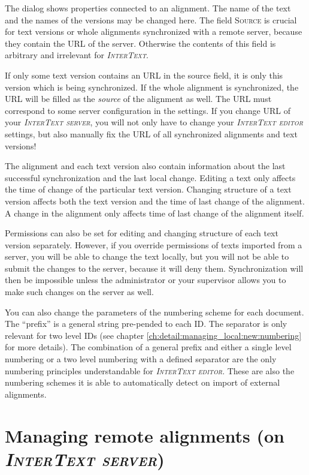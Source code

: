 \documentclass[a4paper,10pt,oneside]{book}
\newcommand{\IT}{\textit{\textsc{InterText}}\xspace}
\newcommand{\ITeditor}{\textit{\textsc{InterText editor}}\xspace}
\newcommand{\ITserver}{\textit{\textsc{InterText server}}\xspace}
\newcommand{\menu}[1]{\textsc{#1}}
\begin{document}
The dialog shows properties connected to an alignment. The name of the text and the names of the versions may be changed here. The field \menu{Source} is crucial for text versions or whole alignments synchronized with a remote server, because they contain the URL of the server. Otherwise the contents of this field is arbitrary and irrelevant for \IT.

If only some text version contains an URL in the source field, it is only this version which is being synchronized. If the whole alignment is synchronized, the URL will be filled as the \emph{source} of the alignment as well. The URL must correspond to some server configuration in the settings. If you change URL of your \ITserver, you will not only have to change your \ITeditor settings, but also manually fix the URL of all synchronized alignments and text versions!

The alignment and each text version also contain information about the last successful synchronization and the last local change. Editing a text only affects the time of change of the particular text version. Changing structure of a text version affects both the text version and the time of last change of the alignment. A change in the alignment only affects time of last change of the alignment itself.

Permissions can also be set for editing and changing structure of each text version separately. However, if you override permissions of texts imported from a server, you will be able to change the text locally, but you will not be able to submit the changes to the server, because it will deny them. Synchronization will then be impossible unless the administrator or your supervisor allows you to make such changes on the server as well.

You can also change the parameters of the numbering scheme for each document. The ``prefix'' is a general string pre-pended to each ID. The separator is only relevant for two level IDs (see chapter \ref{ch:detail:managing_local:new:numbering} for more details). The combination of a general prefix and either a single level numbering or a two level numbering with a defined separator are the only numbering principles understandable for \ITeditor. These are also the numbering schemes it is able to automatically detect on import of external alignments.

\chapter{Managing remote alignments (on \ITserver)}\label{ch:detail:managing_remote}
\end{document}
